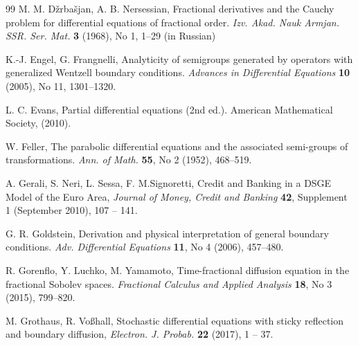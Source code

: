 \documentclass[11pt,a4paper]{article}
\newcommand{\magenta}{black}
\begin{document}
\begin{thebibliography}{99}
M. M. D\v{z}rba\v{s}jan,  A. B. Nersessian,
Fractional derivatives and the Cauchy problem for differential equations of fractional order. 
\textit{Izv. Akad. Nauk Armjan. SSR. Ser. Mat.} \textbf{3} (1968), No 1, 1--29 (in Russian)


K.-J. Engel, G. Frangnelli,
Analyticity of semigroups generated by operators with generalized Wentzell boundary conditions.
\textit{Advances in Differential Equations} \textbf{10} (2005), No 11, 1301--1320.

{\color{\magenta}
L. C. Evans, Partial differential equations (2nd ed.). American Mathematical Society, (2010).
}




W. Feller,
The parabolic differential equations and the associated semi-groups of transformations. 
\textit{Ann. of Math.} {\bf 55}, No 2 (1952), 468--519.

A. Gerali, S. Neri, L. Sessa, F. M.Signoretti,
Credit and Banking in a DSGE Model of the Euro Area,
\textit{Journal of Money, Credit and Banking} {\bf 42}, Supplement 1 (September 2010), 107 -- 141.

G. R. Goldstein,
Derivation and physical interpretation of general boundary conditions.
\textit{Adv. Differential Equations} \textbf{11}, No 4 (2006), 457--480.


R. Gorenflo, Y. Luchko, M. Yamamoto,
Time-fractional diffusion equation in the fractional Sobolev spaces. 
\textit{Fractional Calculus and Applied Analysis} \textbf{18}, No 3 (2015), 799--820.



M. Grothaus, R. Vo\ss hall,
Stochastic differential equations with sticky reflection and boundary diffusion,
\textit{Electron. J. Probab.} {\bf 22} (2017), 1 -- 37.



\end{thebibliography}
\end{document}
